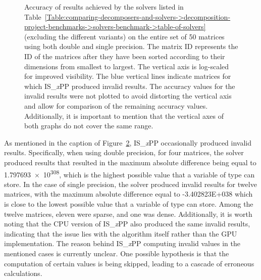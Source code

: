 \begin{figure}[ht!]
\begin{subfigure}{\textwidth}
		\label{Figure:comparing-decomposers-and-solvers->decomposition-project-benchmarks->solvers-benchmark->accuracy-of-results-on-all-matrices->single-precision}
	\end{subfigure}
	\caption{Accuracy of results achieved by the solvers listed in Table~\ref{Table:comparing-decomposers-and-solvers->decomposition-project-benchmarks->solvers-benchmark->table-of-solvers} (excluding the different variants) on the entire set of 50 matrices using both double and single precision.
		The matrix ID represents the ID of the matrices after they have been sorted according to their dimensions from smallest to largest.
		The vertical axis is log-scaled for improved visibility.
		The blue vertical lines indicate matrices for which IS\_\textit{x}PP produced invalid results.
		The accuracy values for the invalid results were not plotted to avoid distorting the vertical axis and allow for comparison of the remaining accuracy values.
		Additionally, it is important to mention that the vertical axes of both graphs do not cover the same range.
	}
	\label{Figure:comparing-decomposers-and-solvers->decomposition-project-benchmarks->solvers-benchmark->accuracy-of-results-on-all-matrices->double-and-single-precision}
\end{figure}

As mentioned in the caption of Figure~\ref{Figure:comparing-decomposers-and-solvers->decomposition-project-benchmarks->solvers-benchmark->accuracy-of-results-on-all-matrices->double-and-single-precision}, IS\_\textit{x}PP occasionally produced invalid results.
Specifically, when using double precision, for four matrices, the solver produced results that resulted in the maximum absolute difference being equal to \num{1.797693e+308}, which is the highest possible value that a variable of type  can store.
In the case of single precision, the solver produced invalid results for twelve matrices, with the maximum absolute difference equal to -\num{3.402823E+038} which is close to the lowest possible value that a variable of type  can store.
Among the twelve matrices, eleven were sparse, and one was dense.
Additionally, it is worth noting that the CPU version of IS\_\textit{x}PP also produced the same invalid results, indicating that the issue lies with the algorithm itself rather than the GPU implementation.
The reason behind IS\_\textit{x}PP computing invalid values in the mentioned cases is currently unclear.
One possible hypothesis is that the computation of certain values is being skipped, leading to a cascade of erroneous calculations.


